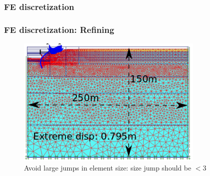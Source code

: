 \documentclass[notes]{beamer}
\begin{document}
\begin{frame}
\frametitle{FE discretization}
\end{frame}

\begin{frame}
\frametitle{FE discretization: Refining}
\begin{figure}[ht]
	\centering
	\includegraphics[width=0.8\textwidth]{figs/refined-mesh.png}
	\caption*{Avoid large jumps in element size: size jump should be $< 3$}
\end{figure}
\end{frame}
\end{document}
